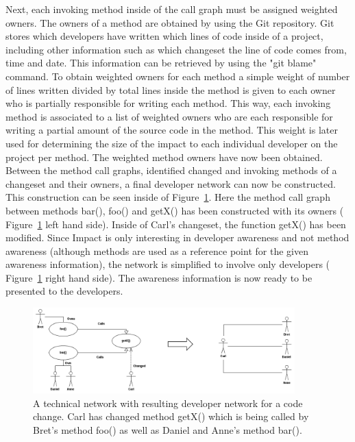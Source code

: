 \documentclass[conference]{IEEEtran}
\begin{document}
Next, each invoking method inside of the call graph must be assigned weighted owners. The owners of a method are obtained
by using the Git repository. Git stores which developers have written which lines of code inside of a project, including
other information such as which changeset the line of code comes from, time and date. This information can be
retrieved by using the "git blame" command. To obtain weighted owners for each method a simple weight of number 
of lines written divided by total lines inside the method is given to each owner who is partially responsible for writing
each method. This way, each invoking method is associated to a list of weighted owners who are each responsible
for writing a partial amount of the source code in the method. This weight is later used for determining the size
of the impact to each individual developer on the project per method. The weighted method owners have now been obtained. \\

Between the method call graphs, identified changed and invoking methods of a changeset and their owners,
a final developer network can now be constructed. This construction can be seen inside of Figure~\ref{fig:network}.
Here the method call graph between methods bar(), foo() and getX() has been constructed with its owners
( Figure~\ref{fig:network} left hand side).
Inside of Carl's changeset, the function getX() has been modified. Since Impact is only interesting in developer
awareness and not method awareness (although methods are used as a reference point for the given awareness
information), the network is simplified to involve only developers
( Figure~\ref{fig:network} right hand side). The awareness information is now ready to be presented to the
developers. \\

\begin{figure}[tb!]
\centering
\includegraphics[width=0.9\textwidth]{images/TecNetwork}
\caption{A technical network with resulting developer network for a code change. Carl has changed method getX() which is being
called by Bret's method foo() as well as Daniel and Anne's method bar().\label{fig:network}}
\end{figure}
\end{document}

